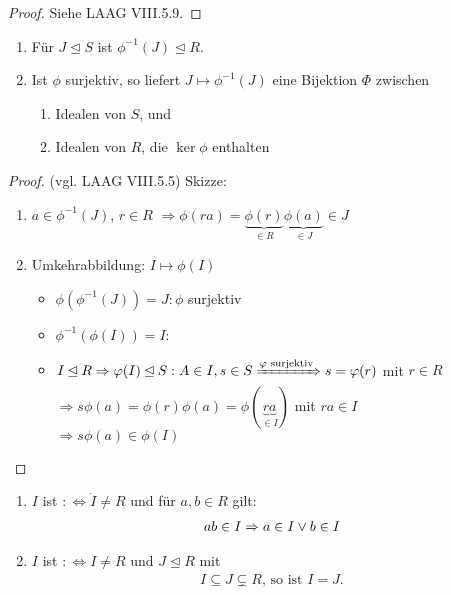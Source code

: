 \begin{proof}
	Siehe LAAG VIII.5.9.
\end{proof}

\begin{lemma}
	\begin{enumerate}
		\item Für $J \unlhd S$ ist $\phi^{-1}(J) \unlhd R$.
		\item Ist $\phi$ surjektiv, so liefert $J \mapsto \phi^{-1}(J)$ eine Bijektion $\Phi$ zwischen
		\begin{enumerate}
			\item Idealen von $S$, und
			\item Idealen von $R$, die $\ker \phi$ enthalten
		\end{enumerate}
	\end{enumerate}
\end{lemma}

\begin{proof}
	(vgl. LAAG VIII.5.5)
	Skizze:
	\begin{enumerate}%
		\item $a \in \phi^{-1}(J)$, $r \in R$ $\Rightarrow \phi(ra) = \underbrace{\phi(r)}_{\in R}\underbrace{\phi(a)}_{\in J}\in J$
		\item Umkehrabbildung: $I \mapsto \phi(I)$
		\begin{itemize}
			\item $\phi(\phi^{-1}(J))=J\colon \phi$ surjektiv
			\item $\phi^{-1}(\phi(I)) = I\colon$ 
			\item $I \unlhd R \Rightarrow \phi(I) \unlhd S: A \in I, s \in S \xRightarrow{\phi \text{ surjektiv}} s = \phi(r)$ mit $r \in R$\\
			$\Rightarrow s \phi(a) = \phi(r)\phi(a) = \phi(\underbrace{ra}_{\in I})$ mit $ra \in I$\\
			$\Rightarrow s\phi(a) \in \phi(I)$
		\end{itemize}
	\end{enumerate}
\end{proof}

\begin{definition}
	\begin{enumerate}
		\item $I$ ist  $:\Leftrightarrow \dot{I} \neq R$ und für $a,b \in R$ gilt:
		\begin{align}
			ab \in I \Rightarrow a \in I \vee b \in I\notag
		\end{align}
		\item $I$ ist  $:\Leftrightarrow I \neq R$ und $J \unlhd R$ mit
		\begin{align}
			I \subseteq J \subsetneq R\text{, so ist } I = J.
		\end{align}
	\end{enumerate}
\end{definition}

